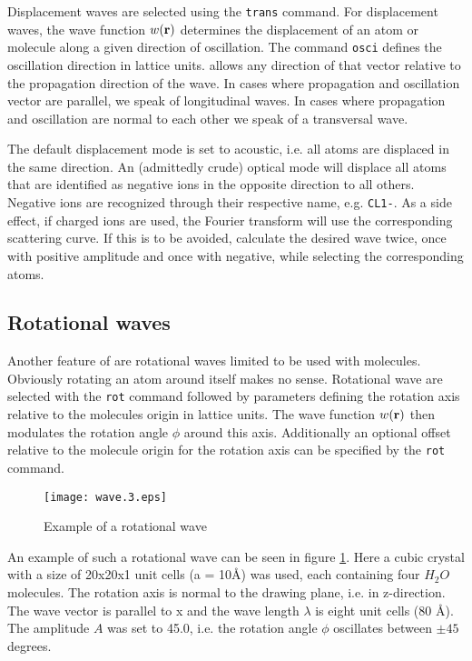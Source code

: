 Displacement waves are selected using the {\tt trans} command.  For
displacement waves, the wave function $w({\bf r})$ determines the
displacement of an atom or molecule along a given direction of
oscillation. The command {\tt osci} defines the oscillation
direction in lattice units. \Discus allows any direction of
that vector relative to the propagation direction of the wave.  In
cases where propagation and oscillation vector are parallel, we
speak of longitudinal waves. In cases where propagation and
oscillation are normal to each other we speak of a transversal wave.
\par

The default displacement mode is set to acoustic, i.e.  all atoms
are displaced in the same direction.  An (admittedly crude) optical
mode will displace all atoms that are identified as negative ions in
the opposite direction to all others.  Negative ions are recognized
through their respective name, e.g. {\tt CL1-}. As a side effect, if
charged ions are used, the Fourier transform will use the
corresponding scattering curve.  If this is to be avoided, calculate
the desired wave twice, once with positive amplitude and once with
negative, while selecting the corresponding atoms.

\subsection*{Rotational waves \label{mod-wave-rot}}

Another feature of \Discus are rotational waves limited to be
used with molecules.  Obviously rotating an atom around itself makes
no sense. Rotational wave are selected with the {\tt rot} command
followed by parameters defining the rotation axis relative to the
molecules origin in lattice units.  The wave function $w({\bf r})$
then modulates the rotation angle ${\phi}$ around this axis.
Additionally an optional offset relative to the molecule origin for
the rotation axis can be specified by the {\tt rot} command.
%
\begin{figure}[!tbh]
   \centering
   \texttt{[image: wave.3.eps]}
   \caption{Example of a rotational wave}
   \label{wave-fig3}
\end{figure}
%
An example of such a rotational wave can be seen in figure
\ref{wave-fig3}. Here a cubic crystal with a size of 20x20x1 unit
cells (a = 10\AA) was used, each containing four $H_{2}O$ molecules.
The rotation axis is normal to the drawing plane, i.e. in
z-direction.  The wave vector is parallel to x and the wave length
$\lambda$ is eight unit cells (80 \AA).  The amplitude $A$ was set
to 45.0, i.e.  the rotation angle $\phi$ oscillates between $\pm 45$
degrees. \par

